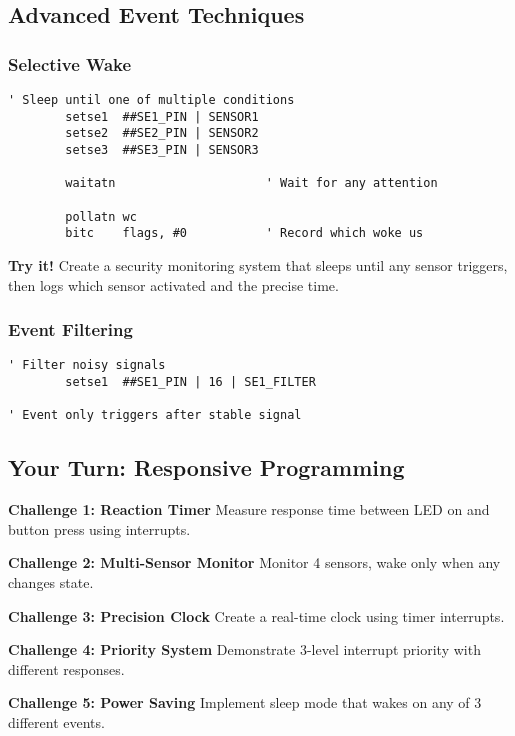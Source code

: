 \documentclass[11pt]{book}
\begin{document}
\hypertarget{advanced-event-techniques}{%
\subsection{Advanced Event Techniques}\label{advanced-event-techniques}}

\hypertarget{selective-wake}{%
\subsubsection{Selective Wake}\label{selective-wake}}

\begin{lstlisting}
' Sleep until one of multiple conditions
        setse1  ##SE1_PIN | SENSOR1
        setse2  ##SE2_PIN | SENSOR2
        setse3  ##SE3_PIN | SENSOR3
        
        waitatn                     ' Wait for any attention
        
        pollatn wc
        bitc    flags, #0           ' Record which woke us
\end{lstlisting}

\textbf{Try it!} Create a security monitoring system that sleeps until
any sensor triggers, then logs which sensor activated and the precise
time.

\hypertarget{event-filtering}{%
\subsubsection{Event Filtering}\label{event-filtering}}

\begin{lstlisting}
' Filter noisy signals
        setse1  ##SE1_PIN | 16 | SE1_FILTER
        
' Event only triggers after stable signal
\end{lstlisting}

\hypertarget{your-turn-responsive-programming}{%
\subsection{Your Turn: Responsive
Programming}\label{your-turn-responsive-programming}}

\begin{yourturn}
\textbf{Challenge 1: Reaction Timer}
Measure response time between LED on and button press using interrupts.

\textbf{Challenge 2: Multi-Sensor Monitor}
Monitor 4 sensors, wake only when any changes state.

\textbf{Challenge 3: Precision Clock}
Create a real-time clock using timer interrupts.

\textbf{Challenge 4: Priority System}
Demonstrate 3-level interrupt priority with different responses.

\textbf{Challenge 5: Power Saving}
Implement sleep mode that wakes on any of 3 different events.
\end{yourturn}
\end{document}
